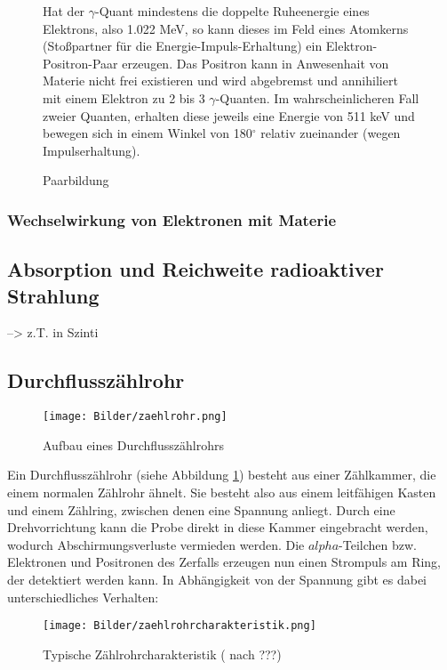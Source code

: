 \begin{figure}[H]
	\begin{minipage}{0.5\textwidth}
	\centering %
	\caption{Paarbildung}
	\end{minipage}
	\begin{minipage}{0.5\textwidth}
	Hat der $\gamma$-Quant mindestens die doppelte Ruheenergie eines Elektrons, also 1.022 MeV, so kann dieses im Feld eines Atomkerns (Stoßpartner für die Energie-Impuls-Erhaltung) ein Elektron-Positron-Paar erzeugen. Das Positron kann in Anwesenhait von Materie nicht frei existieren und wird abgebremst und annihiliert mit einem Elektron zu 2 bis 3 $\gamma$-Quanten. Im wahrscheinlicheren Fall zweier Quanten, erhalten diese jeweils eine Energie von 511 keV und bewegen sich in einem Winkel von 180$^\circ$ relativ zueinander (wegen Impulserhaltung).
	\end{minipage}
\end{figure}

\subsubsection{Wechselwirkung von Elektronen mit Materie}

\subsection{Absorption und Reichweite radioaktiver Strahlung}
 --> z.T. in Szinti

\subsection{Durchflusszählrohr}
\begin{figure}[H]
 \centering \texttt{[image: Bilder/zaehlrohr.png]}
 \caption{Aufbau eines Durchflusszählrohrs}
 \label{durchflusszaehlrohr}
\end{figure}
Ein Durchflusszählrohr (siehe Abbildung \ref{durchflusszaehlrohr}) besteht aus einer Zählkammer, die einem normalen Zählrohr ähnelt. Sie besteht also aus einem leitfähigen Kasten und einem Zählring, zwischen denen eine Spannung anliegt. Durch eine Drehvorrichtung kann die Probe direkt in diese Kammer eingebracht werden, wodurch Abschirmungsverluste vermieden werden. Die $alpha$-Teilchen bzw. Elektronen und Positronen des Zerfalls erzeugen nun einen Strompuls am Ring, der detektiert werden kann. In Abhängigkeit von der Spannung gibt es dabei unterschiedliches Verhalten:
\begin{figure}[H]
 \centering \texttt{[image: Bilder/zaehlrohrcharakteristik.png]}
 \caption{Typische Zählrohrcharakteristik ( nach ???)}
\end{figure}
